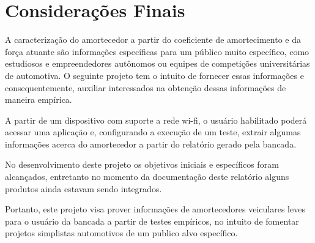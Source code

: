 \chapter[Considerações Finais]{Considerações Finais}
\label{chap:consideracoes}
	
	A caracterização do amortecedor a partir do coeficiente de amortecimento e da força atuante são informações específicas para um público muito específico, como estudiosos e empreendedores autônomos ou equipes de competições universitárias de automotiva. O seguinte projeto tem o intuito de fornecer essas informações e consequentemente, auxiliar interessados na obtenção dessas informações de maneira empírica.
	
	A partir de um dispositivo com suporte a rede wi-fi, o usuário habilitado poderá acessar uma aplicação e, configurando a execução de um teste, extrair algumas informações acerca do amortecedor a partir do relatório gerado pela bancada.
	
	No desenvolvimento deste projeto os objetivos iniciais e específicos foram alcançados, entretanto no momento da documentação deste relatório alguns produtos ainda estavam sendo integrados.
	
	Portanto, este projeto visa prover informações de amortecedores veiculares leves para o usuário da bancada a partir de testes empíricos, no intuito de fomentar projetos simplistas automotivos de um publico alvo específico.



	